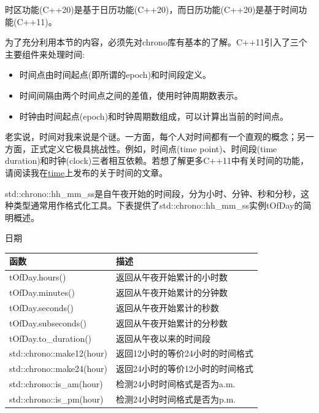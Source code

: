 时区功能(C++20)是基于日历功能(C++20)，而日历功能(C++20)是基于时间功能(C++11)。


\begin{tcolorbox}[breakable,enhanced jigsaw,colback=blue!5!white,colframe=blue!75!black,title={C++11的时间库}]
	
为了充分利用本节的内容，必须先对chrono库有基本的了解。C++11引入了三个主要组件来处理时间:

\begin{itemize}
\item 
时间点由时间起点(即所谓的epoch)和时间段定义。

\item 
时间间隔由两个时间点之间的差值，使用时钟周期数表示。

\item 
时钟由时间起点(epoch)和时钟周期数组成，可以计算出当前的时间点。
\end{itemize}

老实说，时间对我来说是个谜。一方面，每个人对时间都有一个直观的概念；另一方面，正式定义它极具挑战性。例如，时间点(time point)、时间段(time duration)和时钟(clock)三者相互依赖。若想了解更多C++11中有关时间的功能，请阅读我在\href{https://www.modernescpp.com/index.php/tag/time}{time}上发布的关于时间的文章。
	
\end{tcolorbox}


std::chrono::hh\_mm\_ss是自午夜开始的时间段，分为小时、分钟、秒和分秒，这种类型通常用作格式化工具。下表提供了std::chrono::hh\_mm\_ss实例tOfDay的简明概述。

\begin{center}
日期
\end{center}

\begin{table}[H]
\centering
\begin{tabular}{ll}
\textbf{函数}         & \textbf{描述}                        \\ \hline
tOfDay.hours()            & 返回从午夜开始累计的小时数   \\
tOfDay.minutes()          & 返回从午夜开始累计的分钟数 \\
tOfDay.seconds()          & 返回从午夜开始累计的秒数 \\
tOfDay.subseconds()       & 返回从午夜开始累计的分秒数  \\
tOfDay.to\_duration()     & 返回从午夜以来的时间段    \\
std::chrono::make12(hour) & 返回12小时的等价24小时的时间格式 \\
std::chrono::make24(hour) & 返回24小时的等价12小时的时间格式 \\
std::chrono::is\_am(hour) & 检测24小时时间格式是否为a.m.  \\
std::chrono::is\_pm(hour) & 检测24小时时间格式是否为p.m.
\end{tabular}
\end{table}

